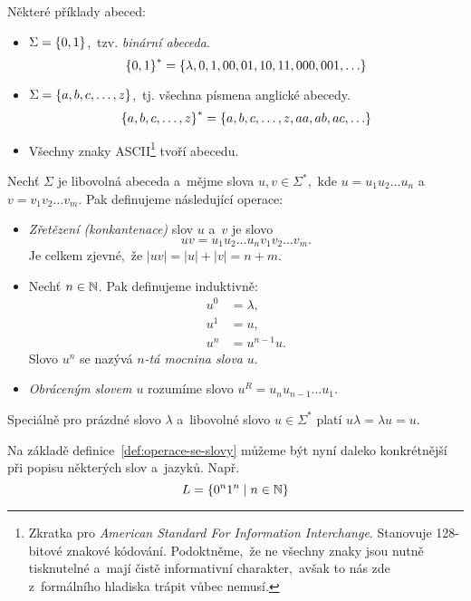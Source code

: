 \begin{example}
    Některé příklady abeced:
    \begin{itemize}
        \item $\Sigma=\left\{0,1\right\}$,~tzv. \emph{binární abeceda}.
        \[\left\{0,1\right\}^*=\left\{\lambda,0,1,00,01,10,11,000,001,\ldots\right\}\]
        \item $\Sigma=\left\{a,b,c,\ldots,z\right\}$,~tj. všechna písmena anglické abecedy.
        \[\left\{a,b,c,\ldots,z\right\}^*=\left\{a,b,c,\ldots,z,aa,ab,ac,\ldots\right\}\]
        \item Všechny znaky ASCII\footnote{Zkratka pro \emph{American Standard For Information Interchange}. Stanovuje 128-bitové znakové kódování. Podoktněme,~že ne všechny znaky jsou nutně tisknutelné a~mají čistě informativní charakter,~avšak to nás zde z~formálního hladiska trápit vůbec nemusí.} tvoří abecedu.
    \end{itemize}
\end{example}
\begin{definition}\label{def:operace-se-slovy}
    Nechť $\Sigma$ je libovolná abeceda a~mějme slova $u,v\in\Sigma^*$,~kde $u=u_1u_2\ldots u_n$ a~$v=v_1v_2\ldots v_m$. Pak definujeme následující operace:
    \begin{itemize}
        \item \emph{Zřetězení (konkantenace)} slov $u$ a~$v$ je slovo
        \[uv=u_1u_2\ldots u_nv_1v_2\ldots v_m.\]
        Je celkem zjevné,~že $|uv|=|u|+|v|=n+m$.
        \item Nechť $n\in\mathbb{N}$. Pak definujeme induktivně:
        \begin{align*}
            u^0&=\lambda,\\
            u^1&=u,\\
            u^n&=u^{n-1}u.
        \end{align*}
        Slovo $u^n$ se nazývá \emph{$n$-tá mocnina slova} $u$.
        \item \emph{Obráceným slovem $u$} rozumíme slovo $u^R=u_nu_{n-1}\ldots u_1$.
    \end{itemize}
\end{definition}
\begin{remark}
    Speciálně pro prázdné slovo $\lambda$ a~libovolné slovo $u\in\Sigma^*$ platí $u\lambda=\lambda u=u$.
\end{remark}
Na základě definice~\ref{def:operace-se-slovy} můžeme být nyní daleko konkrétnější při popisu některých slov a~jazyků. Např.
\[L=\left\{0^n1^n\mid n\in\mathbb{N}\right\}\]
